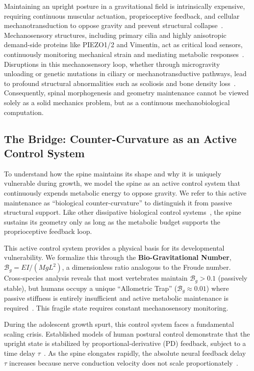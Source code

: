 Maintaining an upright posture in a gravitational field is intrinsically expensive, requiring continuous muscular actuation, proprioceptive feedback, and cellular mechanotransduction to oppose gravity and prevent structural collapse~\cite{latimer2005upright, bastien2013unifying, govey2013gravity, proximo2012proprioception}. Mechanosensory structures, including primary cilia and highly anisotropic demand-side proteins like PIEZO1/2 and Vimentin, act as critical load sensors, continuously monitoring mechanical strain and mediating metabolic responses~\cite{assaraf2020piezo2, coste2010piezo, wuest2025vim}. Disruptions in this mechanosensory loop, whether through microgravity unloading or genetic mutations in ciliary or mechanotransductive pathways, lead to profound structural abnormalities such as scoliosis and bone density loss~\cite{lv2023yap, djebar2024astrogliosis, ramli2024piezo1}. Consequently, spinal morphogenesis and geometry maintenance cannot be viewed solely as a solid mechanics problem, but as a continuous mechanobiological computation.

\subsection{The Bridge: Counter-Curvature as an Active Control System}
To understand how the spine maintains its shape and why it is uniquely vulnerable during growth, we model the spine as an active control system that continuously expends metabolic energy to oppose gravity. We refer to this active maintenance as ``biological counter-curvature'' to distinguish it from passive structural support. Like other dissipative biological control systems~\cite{prigogine1977self, friston2013life}, the spine sustains its geometry only as long as the metabolic budget supports the proprioceptive feedback loop.

This active control system provides a physical basis for its developmental vulnerability. We formalize this through the \textbf{Bio-Gravitational Number}, $\mathcal{B}_g = EI / (M g L^2)$, a dimensionless ratio analogous to the Froude number. Cross-species analysis reveals that most vertebrates maintain $\mathcal{B}_g > 0.1$ (passively stable), but humans occupy a unique ``Allometric Trap'' ($\mathcal{B}_g \approx 0.01$) where passive stiffness is entirely insufficient and active metabolic maintenance is required~\cite{lovejoy2005hominid, meyer_2021}. This fragile state requires constant mechanosensory monitoring.

During the adolescent growth spurt, this control system faces a fundamental scaling crisis. Established models of human postural control demonstrate that the upright state is stabilized by proportional-derivative (PD) feedback, subject to a time delay $\tau$~\cite{milton2009time, insperger2013acceleration}. As the spine elongates rapidly, the absolute neural feedback delay $\tau$ increases because nerve conduction velocity does not scale proportionately~\cite{lang1985nerve}.

